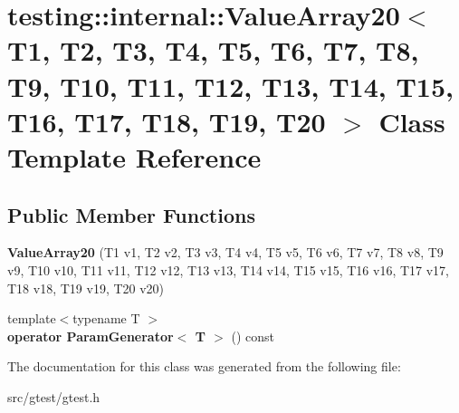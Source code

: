 \hypertarget{classtesting_1_1internal_1_1_value_array20}{}\section{testing\+:\+:internal\+:\+:Value\+Array20$<$ T1, T2, T3, T4, T5, T6, T7, T8, T9, T10, T11, T12, T13, T14, T15, T16, T17, T18, T19, T20 $>$ Class Template Reference}
\label{classtesting_1_1internal_1_1_value_array20}
\subsection*{Public Member Functions}
\begin{DoxyCompactItemize}
\item 
\mbox{\label{classtesting_1_1internal_1_1_value_array20_aafa49e909db9556cdb89692976e80c4a}} 
{\bfseries Value\+Array20} (T1 v1, T2 v2, T3 v3, T4 v4, T5 v5, T6 v6, T7 v7, T8 v8, T9 v9, T10 v10, T11 v11, T12 v12, T13 v13, T14 v14, T15 v15, T16 v16, T17 v17, T18 v18, T19 v19, T20 v20)
\item 
\mbox{\label{classtesting_1_1internal_1_1_value_array20_abcf63e97d31f62868dab49f1667e9d4f}} 
{\footnotesize template$<$typename T $>$ }\\{\bfseries operator Param\+Generator$<$ T $>$} () const
\end{DoxyCompactItemize}


The documentation for this class was generated from the following file\+:\begin{DoxyCompactItemize}
\item 
src/gtest/gtest.\+h\end{DoxyCompactItemize}

